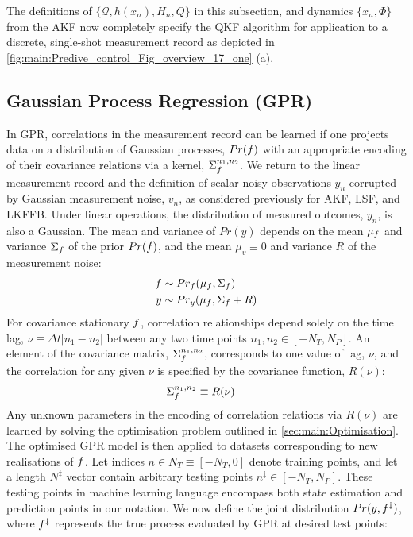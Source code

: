 The definitions of $\{ \mathcal{Q}, h(x_n), H_n, Q \}$ in this subsection, and dynamics $\{x_n, \Phi\}$ from the AKF now completely specify the QKF algorithm for application to a discrete, single-shot measurement record as depicted in \cref{fig:main:Predive_control_Fig_overview_17_one} (a).  

\subsection{Gaussian Process Regression (GPR)}

In GPR, correlations in the measurement record can be learned if one projects data on a distribution of Gaussian processes, $Pr(f)$ with an appropriate encoding of their covariance relations via a kernel, $\Sigma_f^{n_1, n_2}$. We return to the linear measurement record and the definition of scalar noisy observations $y_{n}$ corrupted by Gaussian measurement noise, $v_n$, as considered previously for AKF, LSF, and LKFFB.  
Under linear operations, the distribution of measured outcomes, $y_n$, is also a Gaussian. The  mean and variance of $Pr(y)$  depends on the mean $\mu_f$ and variance $\Sigma_f$ of the prior $Pr(f)$, and the mean $\mu_v \equiv 0$ and variance $R$ of the measurement noise: 
\begin{align}
f & \sim Pr_f(\mu_f,\Sigma_f ) \\
y & \sim Pr_y(\mu_f,\Sigma_f + R ) 
\end{align}
For covariance stationary $f$, correlation relationships depend solely on the time lag, $\nu \equiv \Delta t|n_1 - n_2|$ between any two time points  $n_1, n_2 \in [-N_T, N_P]$.  An element of the covariance matrix, $\Sigma_f^{n_1,n_2}$, corresponds to one value of lag, $\nu$, and the correlation for any given $\nu$  is specified by the covariance function, $R(\nu)$:
\begin{align}
\Sigma_f^{n_1,n_2} & \equiv R(\nu) 
\end{align}
Any unknown parameters in the encoding of correlation relations via $R(\nu)$ are learned by solving the optimisation problem outlined in \cref{sec:main:Optimisation}. The optimised GPR model is then applied to datasets corresponding to new realisations of $f$. Let indices $n \in N_T \equiv [-N_T, 0]$ denote training points, and let a length $N^{\ddagger} $ vector contain arbitrary testing points $n^{\ddagger} \in [-N_T, N_P]$. These testing points in machine learning language encompass both state estimation and prediction points in our notation. We now define the joint distribution $Pr(y,f^{\ddagger})$, where $f^{\ddagger}$ represents the true process evaluated by GPR at desired test points: 
